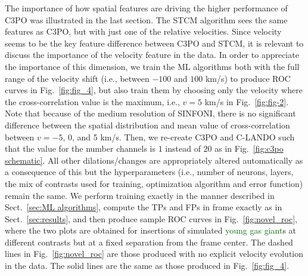 \documentclass[referee]{aa} %
\newcommand{\newchange}[1]{\textcolor{darkgreen}{#1}}
\begin{document}
The importance of how spatial features are driving the higher performance of C3PO was illustrated in the last section. The STCM algorithm sees the same features as C3PO, but with just one of the relative velocities.
Since velocity seems to be the key feature difference between C3PO and STCM, it is relevant to discuss the importance of the velocity feature in the data. 
In order to appreciate the importance of this dimension, we train the ML algorithms both with the full range of the velocity shift (i.e., between $-100$ and $100$ km/s) to produce ROC curves in Fig.~\ref{fig:fig_4}, but also train them by choosing only the velocity where the cross-correlation value is the maximum, i.e., $v=5$ km/s in Fig.~\ref{fig:fig-2}.
Note that because of the medium resolution of SINFONI, there is no significant difference between the spatial distribution and mean value of cross-correlation between $v=-5$, 0, and 5 km/s. 
Then, we re-create C3PO and C-LANDO such that the value for the number channels is $1$ instead of $20$ as in Fig.~\ref{fig:c3po schematic}.
All other dilations/changes are appropriately altered automatically as a consequence of this but the hyperparameters (i.e., number of neurons, layers, the mix of contrasts used for training, optimization algorithm and error function) remain the same.
We perform training exactly in the manner described in Sect.~\ref{sec:ML algorithms}, compute the TPs and FPs in frame exactly as in Sect.~\ref{sec:results}, and then produce sample ROC curves in Fig.~\ref{fig:novel_roc}, where the two plots are obtained for insertions of simulated \newchange{young gas giant}s at different contrasts but at a fixed separation from the frame center.
The dashed lines in Fig.~\ref{fig:novel_roc} are those produced with no explicit velocity evolution in the data.
The solid lines are the same as those produced in Fig.~\ref{fig:fig_4}.
\end{document}

